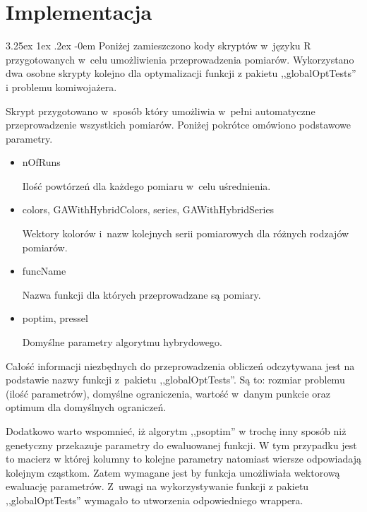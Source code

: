 \documentclass[11pt, a4paper]{article}
\makeatletter
\newcommand{\fbi}{\leavevmode{\parindent=1em\indent}}
\renewcommand\paragraph{\@startsection{paragraph}{5}{\z@}
  {3.25ex \@plus1ex \@minus.2ex}
  {-0em}
  {\normalfont\normalsize\bfseries}}
\makeatother
\begin{document}
\newpage
\section{Implementacja}
\paragraph{}
Poniżej zamieszczono kody skryptów w~języku R przygotowanych w~celu umożliwienia przeprowadzenia pomiarów. Wykorzystano dwa osobne skrypty kolejno dla optymalizacji funkcji z pakietu ,,globalOptTests'' i problemu komiwojażera.



\fbi
Skrypt przygotowano w~sposób który umożliwia w~pełni automatyczne przeprowadzenie wszystkich pomiarów. Poniżej pokrótce omówiono podstawowe parametry.


\begin{itemize}
	\item nOfRuns
	
	Ilość powtórzeń dla każdego pomiaru w~celu uśrednienia.
	
	\item colors, GAWithHybridColors, series, GAWithHybridSeries
	
	Wektory kolorów i~nazw kolejnych serii pomiarowych dla różnych rodzajów pomiarów.
	
	\item funcName
	
	Nazwa funkcji dla których przeprowadzane są pomiary.
	
	\item poptim, pressel
	
	Domyślne parametry algorytmu hybrydowego.
	
\end{itemize}

\fbi
Całość informacji niezbędnych do przeprowadzenia obliczeń odczytywana jest na podstawie nazwy funkcji z~pakietu ,,globalOptTests''. Są to: rozmiar problemu (ilość parametrów), domyślne ograniczenia, wartość w~danym punkcie oraz optimum dla domyślnych ograniczeń.

\fbi
Dodatkowo warto wspomnieć, iż algorytm ,,psoptim'' w trochę inny sposób niż genetyczny przekazuje parametry do ewaluowanej funkcji. W tym przypadku jest to macierz w której kolumny to kolejne parametry natomiast wiersze odpowiadają kolejnym cząstkom. Zatem wymagane jest by funkcja umożliwiała wektorową ewaluację parametrów. Z~uwagi na wykorzystywanie funkcji z pakietu ,,globalOptTests'' wymagało to utworzenia odpowiedniego wrappera.
\end{document}
